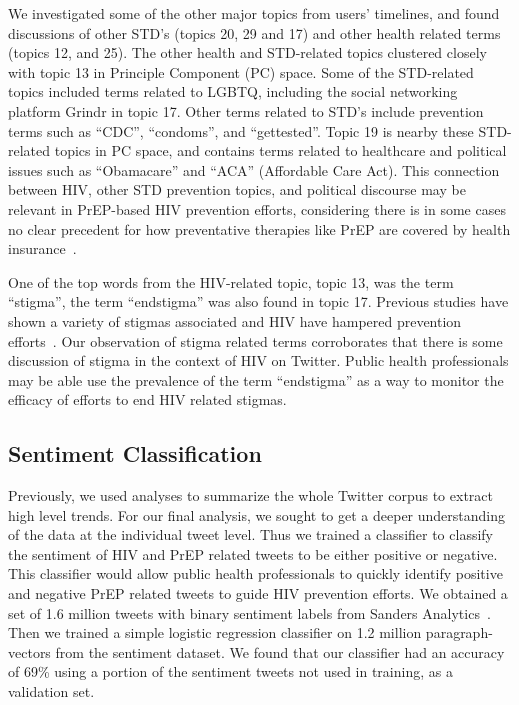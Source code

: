 \documentclass[conference]{IEEEtran}
\begin{document}
We investigated some of the other major topics from users' timelines, and found discussions of other STD's (topics 20, 29 and 17) and other health related terms (topics 12, and 25). The other health and STD-related topics clustered closely with topic 13 in Principle Component (PC) space. Some of the STD-related topics included terms related to LGBTQ, including the social networking platform Grindr in topic 17. Other terms related to STD's include prevention terms such as ``CDC'', ``condoms'', and ``gettested''. Topic 19 is nearby these STD-related topics in PC space, and contains terms related to healthcare and political issues such as ``Obamacare'' and ``ACA'' (Affordable Care Act). This connection between HIV, other STD prevention topics, and political discourse may be relevant in PrEP-based HIV prevention efforts, considering there is in some cases no clear precedent for how preventative therapies like PrEP are covered by health insurance~\cite{liu2014early}.

One of the top words from the HIV-related topic, topic 13, was the term ``stigma'', the term ``endstigma'' was also found in topic 17. Previous studies have shown a variety of stigmas associated and HIV have hampered prevention efforts~\cite{liu2014early}. Our observation of stigma related terms corroborates that there is some discussion of stigma in the context of HIV on Twitter. Public health professionals may be able use the prevalence of the term ``endstigma'' as a way to monitor the efficacy of efforts to end HIV related stigmas.

\subsection{Sentiment Classification}

Previously, we used analyses to summarize the whole Twitter corpus to extract high level trends. For our final analysis, we sought to get a deeper understanding of the data at the individual tweet level. Thus we trained a classifier to classify the sentiment of HIV and PrEP related tweets to be either positive or negative. This classifier would allow public health professionals to quickly identify positive and negative PrEP related tweets to guide HIV prevention efforts. We obtained a set of 1.6 million tweets with binary sentiment labels from Sanders Analytics~\cite{sentimentdata}. Then we trained a simple logistic regression classifier on 1.2 million paragraph-vectors from the sentiment dataset. We found that our classifier had an accuracy of 69\% using a portion of the sentiment tweets not used in training, as a validation set.
\end{document}
